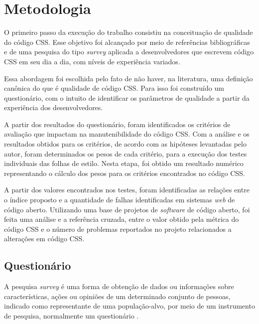 %
%

\chapter{Metodologia}

O primeiro passo da execução do trabalho consistiu na conceituação de qualidade do código CSS. Esse objetivo foi alcançado por meio de referências bibliográficas e de uma pesquisa do tipo \textit{survey} aplicada a desenvolvedores que escrevem código CSS em seu dia a dia, com níveis de experiência variados. 

Essa abordagem foi escolhida pelo fato de não haver, na literatura, uma definição canônica do que é qualidade de código CSS. Para isso foi construído um questionário, com o intuito de identificar os parâmetros de qualidade a partir da experiência dos desenvolvedores.

A partir dos resultados do questionário, foram identificados os critérios de avaliação que impactam na manutenibilidade do código CSS. Com a análise e os resultados obtidos para os critérios, de acordo com as hipóteses levantadas pelo autor, foram determinados os pesos de cada critério, para a execução dos testes individuais das folhas de estilo. Nesta etapa, foi obtido um resultado numérico representando o cálculo dos pesos para os critérios encontrados no código CSS.

A partir dos valores encontrados nos testes, foram identificadas as relações entre o índice proposto e a quantidade de falhas identificadas em sistemas \textit{web} de código aberto. Utilizando uma base de projetos de \textit{software} de código aberto, foi feita uma análise e a referência cruzada, entre o valor obtido pela métrica do código CSS e o número de problemas reportados no projeto relacionados a alterações em código CSS.

\section{Questionário}

A pesquisa \textit{survey} é uma forma de obtenção de dados ou informações sobre características, ações ou opiniões de um determinado conjunto de pessoas, indicado como representante de uma população-alvo, por meio de um instrumento de pesquisa, normalmente um questionário \cite{Freitas2000}. 

